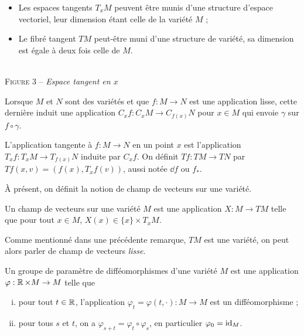 \begin{remarks}
    \begin{itemize}
        \item Les espaces tangents $T_xM$ peuvent être munis d'une structure d'espace 
        vectoriel, leur dimension étant celle de la variété $M$ ;
        \item Le fibré tangent $TM$ peut-être muni d'une structure de variété, sa 
        dimension est égale à deux fois celle de $M$.
    \end{itemize}
\end{remarks}

\begin{center}
    \\
    \vspace{1em}
    \textsc{Figure 3} – \textit{Espace tangent en $x$}
\end{center}

Lorsque $M$ et $N$ sont des variétés et que $f:M\to N$ est une application lisse, 
cette dernière induit une application $C_xf:C_xM\to C_{f(x)}N$ pour $x\in M$ qui 
envoie $\gamma$ sur $f\circ \gamma$.

\begin{defi}
    L'application tangente à $f:M\to N$ en un point $x$ est l'application 
    $T_xf:T_xM\to T_{f(x)}N$ induite par $C_xf$.
    On définit $Tf:TM\to TN$ par $Tf(x,v)=(f(x),T_xf(v))$, aussi notée $\dd f$ ou $f_*$.
\end{defi}

À présent, on définit la notion de champ de vecteurs sur une variété.

\begin{defi}
    Un champ de vecteurs sur une variété $M$ est une application $X:M\to TM$
    telle que pour tout $x\in M$, $X(x)\in\lbrace x\rbrace\times T_xM$.
\end{defi}
Comme mentionné dans une précédente remarque, $TM$ est une variété, on peut alors 
parler de champ de vecteurs \textit{lisse}.

\begin{defi}
    Un groupe de paramètre de difféomorphismes d'une variété $M$ est une application 
    $\varphi:\operatorname{\mathbb R}\times M\to M$ telle que 
    \begin{enumerate}[(i)]
        \item pour tout $t\in\operatorname{\mathbb R}$, l'application $\varphi_t=\varphi(t,\cdot):M\to M$ est 
        un difféomorphisme ;
        \item pour tous $s$ et $t$, on a $\varphi_{s+t}=\varphi_t\circ\varphi_s$, en 
        particulier $\varphi_0=\operatorname{id}_M$.
    \end{enumerate}
\end{defi}

